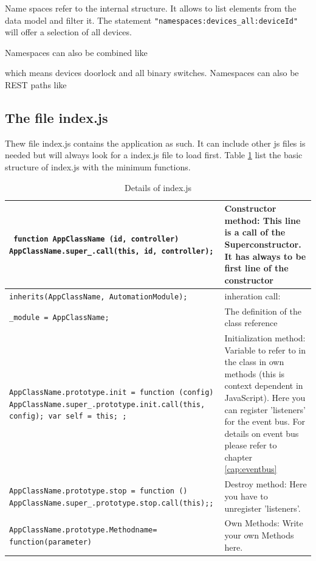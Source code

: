 Name spaces refer to the internal \zway structure. It allows to list elements from 
the \zway data model and filter it. The statement 
\texttt{"namespaces:devices\_all:deviceId"} will offer a selection of all devices.

Namespaces can also be combined like


which means devices doorlock and all binary switches.
Namespaces can also be REST paths like



\subsection{The file index.js}

Thew file index.js contains the application as such. It can include other js files is needed 
but \zway will always look for a index.js file to load first. Table \ref{tab:detailindexjs}
list the basic structure of index.js with the minimum functions.


\begin{table}
\begin{tabular}{|p{}|p{}|}
\hline
\texttt{\tiny 
function AppClassName (id, controller) {AppClassName.super\_.call(this, id, controller);} }&
Constructor method:
This line is a call of the Superconstructor. It has always to be first line of the constructor \\
\hline
\texttt{\tiny inherits(AppClassName, AutomationModule); }
&
inheration call: \\
\hline
\texttt{\tiny \_module = AppClassName;} &
The definition of the class reference \\
\hline
\texttt{\tiny AppClassName.prototype.init = function (config) {
AppClassName.super\_.prototype.init.call(this, config);
var self = this; }; }&
Initialization method: Variable to refer to in the class in own
methods (this is context dependent in JavaScript).
Here you can register 'listeners' for the event bus. For details on event bus please 
refer to chapter \ref{cap:eventbus} \\
\hline

\texttt{\tiny AppClassName.prototype.stop = function () {
AppClassName.super\_.prototype.stop.call(this);}; }&
Destroy method:
Here you have to unregister 'listeners'.  \\
\hline
\texttt{\tiny AppClassName.prototype.Methodname=
function(parameter) }&
Own Methods: Write your own Methods here. \\
\hline
\end{tabular}
\caption{Details of index.js} 
\label{tab:detailindexjs}
\end{table}	
	

